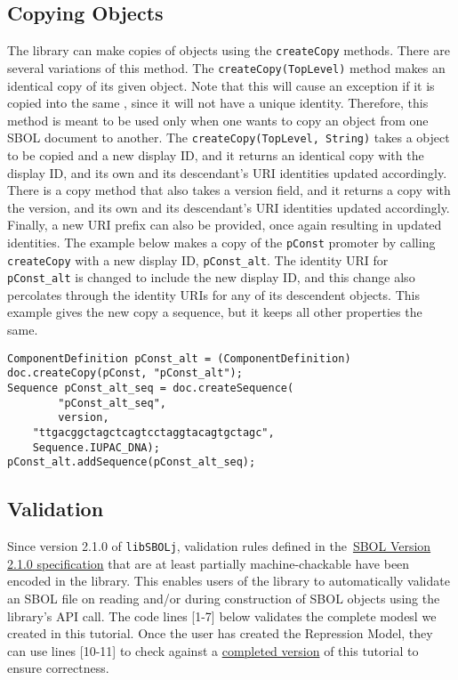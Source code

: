\subsection*{Copying Objects}
The library can make copies of  objects using the \lstinline+createCopy+ methods.  There are several variations of this method. The \lstinline+createCopy(TopLevel)+ method makes an identical copy of its given  object. Note that this will cause an exception if it is copied into the same , since it will not have a unique identity. Therefore, this method is meant to be used only when one wants to copy an object from one SBOL document to another. The \lstinline+createCopy(TopLevel, String)+ takes a  object to be copied and a new display ID, and it returns an identical copy with the display ID, and its own and its descendant's URI identities updated accordingly. There is a copy method that also takes a version field, and it returns a copy with the version, and its own and its descendant's URI identities updated accordingly.  Finally, a new URI prefix can also be provided, once again resulting in updated identities. The example below makes a copy of the
\lstinline+pConst+ promoter by calling \lstinline+createCopy+ with a new display ID, \lstinline+pConst_alt+. The identity URI for \lstinline+pConst_alt+ is changed to include the new display ID, and this change also percolates through the identity URIs for any of its descendent objects.  This example gives the new copy a sequence, but it keeps all other properties the same. 

\vspace{\abovedisplayskip}
\begin{minipage}{0.95\textwidth} 
\begin{lstlisting}
ComponentDefinition pConst_alt = (ComponentDefinition) doc.createCopy(pConst, "pConst_alt");
Sequence pConst_alt_seq = doc.createSequence(
        "pConst_alt_seq", 
        version, 
	"ttgacggctagctcagtcctaggtacagtgctagc",
	Sequence.IUPAC_DNA); 
pConst_alt.addSequence(pConst_alt_seq);
\end{lstlisting}
\end{minipage}

\subsection*{Validation}
Since version 2.1.0 of {\tt libSBOLj}, validation rules defined in
the~\href{http://sbolstandard.org/wp-content/uploads/2016/10/BBF-RFC112-SBOL2.1.0.pdf}{SBOL
  Version 2.1.0 specification} that are at least partially
machine-chackable have been encoded in the library. This enables users
of the library to automatically validate an SBOL file on reading
and/or during construction of SBOL objects using the library's API
call. The code lines [1-7] below validates the complete modesl we created in this
tutorial. Once the user has created the Repression Model, they can use lines [10-11] to check against a \href{https://github.com/SynBioDex/libSBOLj/blob/master/core2/src/test/resources/SBOL2/RepressionModel.rdf}{completed version} of this tutorial to ensure correctness. 

